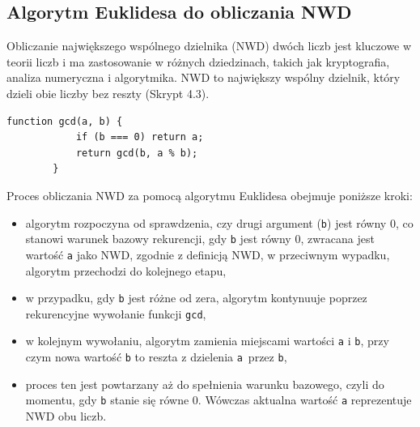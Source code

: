 \documentclass{SGGW-thesis}
\begin{document}
	\subsection{Algorytm Euklidesa do obliczania NWD}
	Obliczanie największego wspólnego dzielnika (NWD) dwóch liczb jest kluczowe w teorii liczb i ma zastosowanie w różnych dziedzinach, takich jak kryptografia, analiza numeryczna i algorytmika. NWD to największy wspólny dzielnik, który dzieli obie liczby bez reszty (Skrypt 4.3).
	\vspace{1em}
	\begin{lstlisting}[caption=Funkcja do obliczania NWD w JavaScript]
		function gcd(a, b) {
			if (b === 0) return a;
			return gcd(b, a % b);
		}
	\end{lstlisting}
	\vspace{1em}
	Proces obliczania NWD za pomocą algorytmu Euklidesa obejmuje poniższe kroki:
	\begin{itemize}
		\item algorytm rozpoczyna od sprawdzenia, czy drugi argument (\texttt{b}) jest równy \( 0 \), co stanowi warunek bazowy rekurencji,
		gdy \texttt{b} jest równy \( 0 \), zwracana jest wartość \texttt{a} jako NWD, zgodnie z definicją NWD, w przeciwnym wypadku, algorytm przechodzi do kolejnego etapu,
		\item w przypadku, gdy \texttt{b} jest różne od zera, algorytm kontynuuje poprzez rekurencyjne wywołanie funkcji \texttt{gcd},
		\item w kolejnym wywołaniu, algorytm zamienia miejscami wartości \texttt{a} i \texttt{b}, przy czym nowa wartość \texttt{b} to reszta z dzielenia \texttt{a}~przez \texttt{b},
		\item proces ten jest powtarzany aż do spełnienia warunku bazowego, czyli do momentu, gdy \texttt{b} stanie się równe 0. Wówczas aktualna wartość \texttt{a} reprezentuje NWD obu liczb.
	\end{itemize}
	\newpage
	
\end{document}
